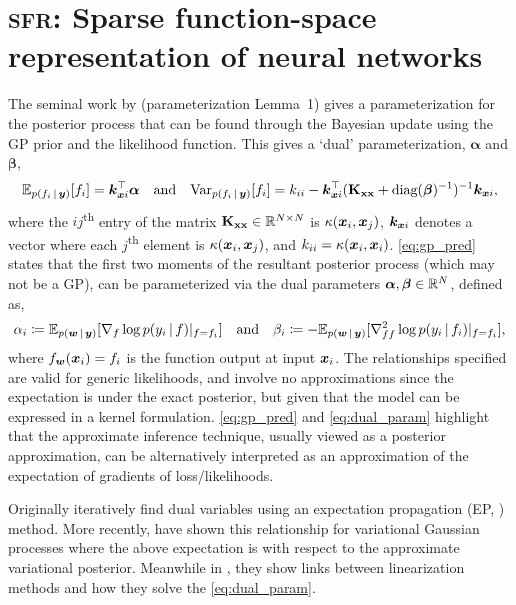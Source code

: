 \documentclass{article} %
\newcommand{\our}{\textsc{sfr}\xspace}
\newcommand{\mathbold}[1]{\bm{#1}}
\newcommand{\mbf}[1]{\mathbf{#1}}
\renewcommand{\mid}{\,|\,}
\newcommand{\valpha}[0]{\mathbold{\alpha}}
\newcommand{\vbeta}[0]{\mathbold{\beta}}
\newcommand{\diag}{\text{{diag}}}
\newcommand{\MKxx}{\mbf{K}_{\mbf{x}\mbf{x}}}
\newcommand{\myexpect}{\mathbb{E}}
\begin{document}
\section{\our: Sparse function-space representation of neural networks}\label{sec:sfr}
The seminal work by \citet{csato2002sparse} (parameterization Lemma~1) gives a parameterization for the posterior process that can be found through the Bayesian update using the GP prior and the likelihood function. This gives a `dual' parameterization, $\valpha$ and $\vbeta$,
%
\begin{equation}  \label{eq:gp_pred}
  \myexpect_{p(f_i \mid\vy)}[f_i]= \vk_{\vx i}^\top \valpha \quad \text{and} \quad
  \mathrm{Var}_{p(f_i \mid \vy)}[f_i] = k_{ii} - \vk_{\vx i}^\top ( \MKxx + \diag(\vbeta)^{-1})^{-1} \vk_{\vx i},
\end{equation}
%
where the $ij$\textsuperscript{th} entry of the matrix $\MKxx \in \R^{N \times N}$ is $\kappa({\bm{x}}_i,{\bm{x}}_j)$, ${\bm{k}}_{{\bm{x}} i}$ denotes a vector where each $j$\textsuperscript{th} element is $\kappa({\bm{x}}_i, {\bm{x}}_j)$, and $k_{ii} = \kappa({\bm{x}}_i, {\bm{x}}_i)$.
\cref{eq:gp_pred} states that the first two moments of the resultant posterior process (which may not be a GP), can be parameterized via the dual
parameters $\valpha, \vbeta \in \R^{N}$,
defined as, 
%
\begin{equation}
  \label{eq:dual_param}
  \alpha_i \coloneqq \myexpect_{p(\vw \mid \vy)}[\nabla_{f}\log p(y_i \mid f) |_{f=f_i}]
  \quad \text{and} \quad
  \beta_i \coloneqq - \myexpect_{p(\vw \mid \vy)}[\nabla^2_{f f}\log p(y_i \mid f_i) |_{f=f_i}],
\end{equation}
%
where $f_{\bm{w}}({\bm{x}}_i) = f_i$ is the function output at input ${\bm{x}}_i$. The relationships specified are valid for generic likelihoods, and involve no approximations since the expectation is under the exact posterior, but given that the model can be expressed in a kernel formulation. \cref{eq:gp_pred} and \cref{eq:dual_param} highlight that the approximate inference technique, usually viewed as a posterior approximation, can be alternatively interpreted as an approximation of the expectation of gradients of loss/likelihoods.

Originally \citet{csato2002sparse} iteratively find dual variables using an expectation propagation (EP, \cite{minka2001expectation}) method. More recently, \cite{khan2017conjugate,adam2021dual} have shown this relationship for variational Gaussian processes where the above expectation is with respect to the approximate variational posterior. Meanwhile in \citet{wilkinson2023bayes}, they show links between linearization methods and how they solve the \cref{eq:dual_param}.
\end{document}
